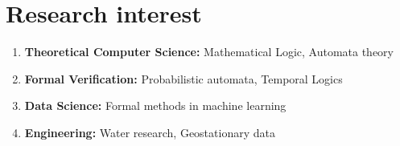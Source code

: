 \documentclass[11pt,a4paper,sans]{moderncv} %
\begin{document}
\makecvtitle %

\newif \ifpersonal
\personalfalse


\newif \iflong
\longfalse

 
 
\ifpersonal

\section{Personal Information}
Date of birth: March 21, 1983 \hfill Citizenship: Indian
\fi

\section{Research interest}
\begin{enumerate}
 \item \textbf{Theoretical Computer Science:} Mathematical Logic, Automata theory
 \item \textbf{Formal Verification:} Probabilistic automata, Temporal Logics
 \item \textbf{Data Science:} Formal methods in machine learning
 \item \textbf{Engineering:} Water research, Geostationary data
\end{enumerate}
\end{document}
